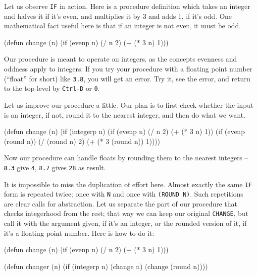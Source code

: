 \documentclass[a4paper,11pt]{article}
\begin{document}
\begin{uenum}
\item Let us observe \Verb+IF+ in action. Here is a procedure definition which takes an integer and halves it if it's even, and multiplies it by 3 and adds 1, if it's odd. One mathematical fact useful here is that if an integer is not even, it must be odd.  

\begin{lispcode}
(defun change (n)
  (if (evenp n)
    (/ n 2)
    (+ (* 3 n) 1)))
\end{lispcode}

\begin{uenumi}
\item Our procedure is meant to operate on integers, as the concepts evenness and oddness apply to integers. If you try your procedure with a floating point number (``float'' for short) like \Verb+3.8+, you will get an error. Try it, see the error, and return to the top-level by \Verb+Ctrl-D+ or \Verb+0+.    
\item Let us improve our procedure a little. Our plan is to first check whether the input is an integer, if not, round it to the nearest integer, and then do what we want. 

\begin{lispcode}
(defun change (n)
  (if (integerp n)
    (if (evenp n)
      (/ n 2)
      (+ (* 3 n) 1))
    (if (evenp (round n))
      (/ (round n) 2)
      (+ (* 3 (round n)) 1))))
\end{lispcode}

Now our procedure can handle floats by rounding them to the nearest integers -- \Verb+8.3+ give \Verb+4+, \Verb+8.7+ gives \Verb+28+ as result.

\item It is impossible to miss the duplication of effort here. Almost exactly the same \Verb+IF+ form is repeated twice; once with \Verb+N+ and once with \Verb+(ROUND N)+. Such repetitions are clear calls for abstraction. Let us separate the part of our procedure that checks integerhood from the rest; that way we can keep our original \Verb+CHANGE+, but call it with the argument given, if it's an integer, or the rounded version of it, if it's a floating point number. Here is how to do it:


\begin{lispcode}
(defun change (n)
  (if (evenp n)
    (/ n 2)
    (+ (* 3 n) 1)))

(defun changer (n)
  (if (integerp n)
    (change n)
    (change (round n))))
\end{lispcode}



\end{uenumi}
\end{uenum}
\end{document}
